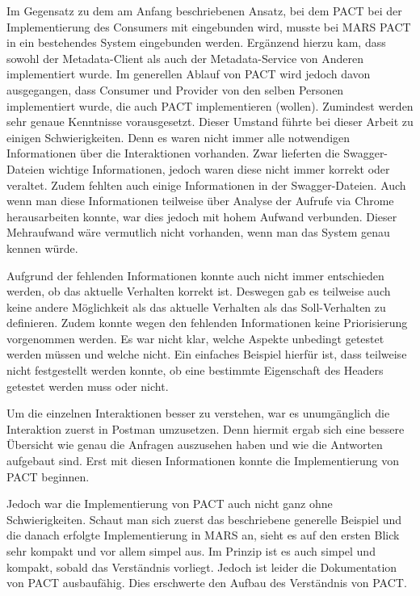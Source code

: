 \documentclass{llncs}
\begin{document}
Im Gegensatz zu dem am Anfang beschriebenen Ansatz, bei dem PACT bei der Implementierung des Consumers mit eingebunden wird, musste bei MARS PACT in ein bestehendes System eingebunden werden. Ergänzend hierzu kam, dass sowohl der Metadata-Client als auch der Metadata-Service von Anderen implementiert wurde. Im generellen Ablauf von PACT wird jedoch davon ausgegangen, dass Consumer und Provider von den selben Personen implementiert wurde, die auch PACT implementieren (wollen). Zumindest werden sehr genaue Kenntnisse vorausgesetzt. Dieser Umstand führte bei dieser Arbeit zu einigen Schwierigkeiten.
Denn es waren nicht immer alle notwendigen Informationen über die Interaktionen vorhanden. Zwar lieferten die Swagger-Dateien wichtige Informationen, jedoch waren diese nicht immer korrekt oder veraltet. Zudem fehlten auch einige Informationen in der Swagger-Dateien. Auch wenn man diese Informationen teilweise über Analyse der Aufrufe via Chrome herausarbeiten konnte, war dies jedoch mit hohem Aufwand verbunden. Dieser Mehraufwand wäre vermutlich nicht vorhanden, wenn man das System genau kennen würde.

Aufgrund der fehlenden Informationen konnte auch nicht immer entschieden werden, ob das aktuelle Verhalten korrekt ist. Deswegen gab es teilweise auch keine andere Möglichkeit als das aktuelle Verhalten als das Soll-Verhalten zu definieren. Zudem konnte wegen den fehlenden Informationen keine Priorisierung vorgenommen werden. Es war nicht klar, welche Aspekte unbedingt getestet werden müssen und welche nicht. Ein einfaches Beispiel hierfür ist, dass teilweise nicht festgestellt werden konnte, ob eine bestimmte Eigenschaft des Headers getestet werden muss oder nicht.

Um die einzelnen Interaktionen besser zu verstehen, war es unumgänglich die Interaktion zuerst in Postman umzusetzen. Denn hiermit ergab sich eine bessere Übersicht wie genau die Anfragen auszusehen haben und wie die Antworten aufgebaut sind. Erst mit diesen Informationen konnte die Implementierung von PACT beginnen.

Jedoch war die Implementierung von PACT auch nicht ganz ohne Schwierigkeiten. Schaut man sich zuerst das beschriebene generelle Beispiel und die danach erfolgte Implementierung in MARS an, sieht es auf den ersten Blick sehr kompakt und vor allem simpel aus. Im Prinzip ist es auch simpel und kompakt, sobald das Verständnis vorliegt. Jedoch ist leider die Dokumentation von PACT ausbaufähig. Dies erschwerte den Aufbau des Verständnis von PACT.
\end{document}
